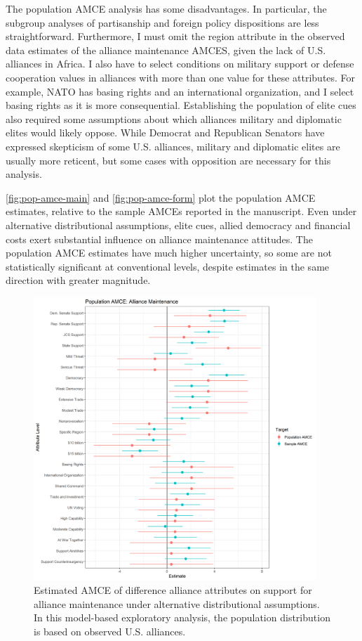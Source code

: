 \documentclass[12pt]{article}
\begin{document}
The population AMCE analysis has some disadvantages. 
In particular, the subgroup analyses of partisanship and foreign policy dispositions are less straightforward. 
Furthermore, I must omit the region attribute in the observed data estimates of the alliance maintenance AMCES, given the lack of U.S. alliances in Africa. 
I also have to select conditions on military support or defense cooperation values in alliances with more than one value for these attributes. 
For example, NATO has basing rights and an international organization, and I select basing rights as it is more consequential.  
Establishing the population of elite cues also required some assumptions about which alliances military and diplomatic elites would likely oppose.
While Democrat and Republican Senators have expressed skepticism of some U.S. alliances, military and diplomatic elites are usually more reticent, but some cases with opposition are necessary for this analysis. 


\autoref{fig:pop-amce-main} and \autoref{fig:pop-amce-form} plot the population AMCE estimates, relative to the sample AMCEs reported in the manuscript. 
Even under alternative distributional assumptions, elite cues, allied democracy and financial costs exert substantial influence on alliance maintenance attitudes. 
The population AMCE estimates have much higher uncertainty, so some are not statistically significant at conventional levels, despite estimates in the same direction with greater magnitude. 



\begin{figure}
	\centering
		\includegraphics[width=0.95\textwidth]{pop-amce-main.png}
	\caption{Estimated AMCE of difference alliance attributes on support for alliance maintenance under alternative distributional assumptions. In this model-based exploratory analysis, the population distribution is based on observed U.S. alliances.}
	\label{fig:pop-amce-main}
\end{figure}
\end{document}
